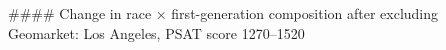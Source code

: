 #### Change in race × first-generation composition after excluding Geomarket: Los Angeles, PSAT score 1270–1520
